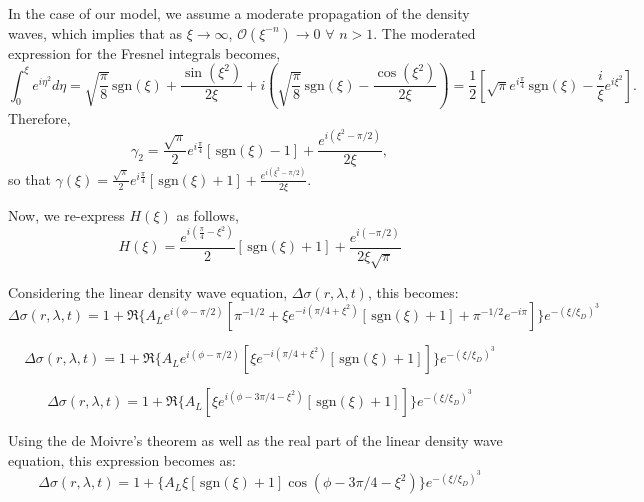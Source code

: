 \documentclass{article}
\begin{document}
In the case of our model, we assume a moderate propagation of the density waves, which implies that as $\xi \rightarrow \infty$, $\mathcal{O}(\xi^{-n}) \rightarrow 0$ $\forall$ $n>1$. The moderated expression for the Fresnel integrals becomes, 
\begin{equation}
\int_{0}^{\xi}e^{i\eta^{2}}d\eta = \sqrt{\frac{\pi}{8}}\,\text{sgn}(\xi) + \frac{\sin(\xi^2)}{2\xi} + i\left(\sqrt{\frac{\pi}{8}}\,\text{sgn}(\xi) - \frac{\cos(\xi^2)}{2\xi}\right) = \frac{1}{2}\left[\sqrt{\pi}e^{i\frac{\pi}{4}}\,\text{sgn}(\xi) - \frac{i}{\xi}e^{i\xi^{2}}\right].
\end{equation}
Therefore, 
\begin{equation}
\gamma_{2} = \frac{\sqrt{\pi}}{2}e^{i\frac{\pi}{4}}\left[\,\text{sgn}(\xi) - 1\right] + \frac{e^{i(\xi^{2} - \pi/2)}}{2\xi},
\end{equation}
so that $\gamma(\xi) = \frac{\sqrt{\pi}}{2}e^{i\frac{\pi}{4}}\left[\,\text{sgn}(\xi) + 1\right] + \frac{e^{i(\xi^{2} - \pi/2)}}{2\xi}$.

Now, we re-express  $H(\xi)$ as follows, 
\begin{equation}
    H(\xi) = \frac{e^{i(\frac{\pi}{4} - \xi^{2})}}{2}\left[\,\text{sgn}(\xi) + 1\right] + \frac{e^{i(-\pi/2)}}{2\xi \sqrt{\pi}}
\end{equation}

Considering the linear density wave equation, $\Delta \sigma(r,\lambda,t)$, this becomes:
\begin{equation}
 \Delta \sigma(r,\lambda,t) = 1 + \Re\{A_{L}e^{i(\phi-\pi/2)}[\pi^{-1/2} + \xi e^{-i{(\pi/4 + \xi^{2})}}\left[\,\text{sgn}(\xi) + 1\right] + \pi^{-1/2}e^{-i\pi}]\} e^{-(\xi/\xi_{D})^{3}}
\end{equation}

\begin{equation}
\Delta \sigma(r,\lambda,t) = 1 + \Re\{A_{L}e^{i(\phi-\pi/2)}[\xi e^{-i{(\pi/4 + \xi^{2})}}\left[\,\text{sgn}(\xi) + 1\right]]\} e^{-(\xi/\xi_{D})^{3}}
\end{equation}


\begin{equation}
\Delta \sigma(r,\lambda,t) = 1 + \Re\{A_{L}[\xi e^{i{(\phi - 3\pi/4 - \xi^{2})}}\left[\,\text{sgn}(\xi) + 1\right]]\} e^{-(\xi/\xi_{D})^{3}}
\end{equation}

Using the de Moivre's theorem as well as the real part of the linear density wave equation, this expression becomes as:
\begin{equation}
\Delta \sigma(r,\lambda,t) = 1 + {\{A_{L}\xi\left[\,\text{sgn}(\xi) + 1\right]\cos{(\phi - 3\pi/4 - \xi^{2})}}\}e^{-(\xi/\xi_{D})^{3}}
\end{equation}
\end{document}
